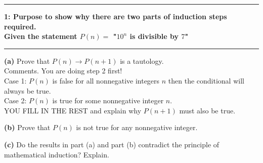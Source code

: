 \documentclass[11pt]{article}
\newcommand\question[2]{\vspace{.25in}\hrule\textbf{#1: #2}\vspace{.5em}\hrule\vspace{.10in}}
\renewcommand\part[1]{\vspace{.10in}\textbf{(#1)}}
\begin{document}
\raggedright
\newcommand\NAME{Stewart Dulaney}  %
\newcommand\SID{1545566}     %
\newcommand\HWNUM{10}              %

\question{1}{Purpose to show why there are two parts of induction steps required.\\[\baselineskip]Given the statement $P(n) =$ "$10^n$ is divisible by $7$"}

\part{a} Prove that $P(n) \rightarrow P(n + 1)$ is a tautology.\\[\baselineskip]
Comments. You are doing step 2 first!\\[\baselineskip]
Case 1: $P(n)$ is false for all nonnegative integers $n$ then the conditional will always be true.\\[\baselineskip]
Case 2: $P(n)$ is true for some nonnegative integer $n$.\\[\baselineskip]
YOU FILL IN THE REST and explain why $P(n + 1)$ must also be true.

\part{b} Prove that $P(n)$ is not true for any nonnegative integer.

\part{c} Do the results in part (a) and part (b) contradict the principle of mathematical induction? Explain.
\end{document}
